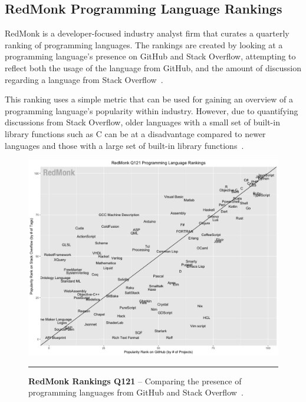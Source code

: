 \subsection{RedMonk Programming Language Rankings}

RedMonk is a developer-focused industry analyst firm that curates a quarterly ranking of programming languages. 
The rankings are created by looking at a programming language's presence on GitHub and Stack Overflow, attempting
to reflect both the usage of the language from GitHub, and the amount of discussion regarding a language from Stack Overflow~\citep{redmonk}.

This ranking uses a simple metric that can be used for gaining an overview of a programming language's popularity within industry. However, due to quantifying discussions from 
Stack Overflow, older languages with a small set of built-in library functions such as C can be at a disadvantage
compared to newer languages and those with a large set of built-in library functions~\citep{opensource}.

\smallskip

\begin{figure}[H]
	\centering
        \includegraphics[width=1.0\textwidth]{media/literature/redmonk.png}
        \rule{35em}{0.5pt}
        \caption[RedMonk Programming Language Rankings for first quarter of 2021]{\textbf{RedMonk Rankings Q121} -- Comparing the presence of programming languages from GitHub and Stack Overflow~\citep{redmonk}.}\label{fig:redmonk}
\end{figure}

